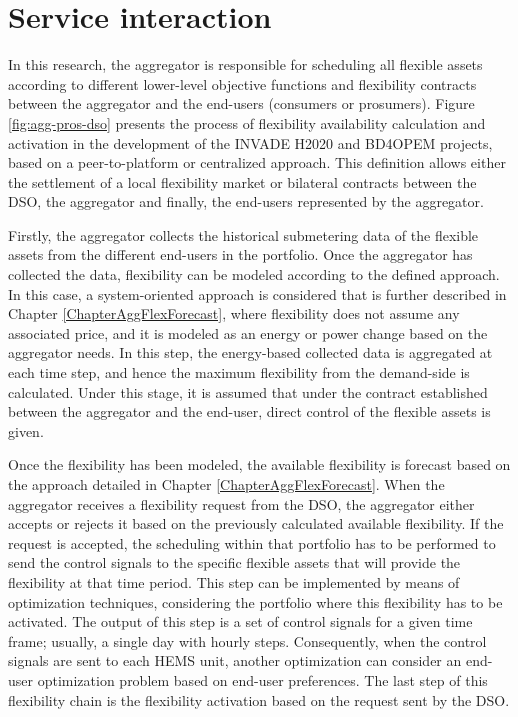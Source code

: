 \section{Service interaction}\label{sec:service_interaction}

In this research, the aggregator is responsible for scheduling all flexible assets according to different lower-level objective functions and flexibility contracts between the aggregator and the end-users (consumers or prosumers). Figure \ref{fig:agg-pros-dso} presents the process of flexibility availability calculation and activation in the development of the INVADE H2020 and BD4OPEM projects, based on a peer-to-platform or centralized approach. This definition allows either the settlement of a local flexibility market or bilateral contracts between the DSO, the aggregator and finally, the end-users represented by the aggregator.  

Firstly, the aggregator collects the historical submetering data of the flexible assets from the different end-users in the portfolio. Once the aggregator has collected the data, flexibility can be modeled according to the defined approach. In this case, a system-oriented approach is considered that is further described in Chapter \ref{ChapterAggFlexForecast}, where flexibility does not assume any associated price, and it is modeled as an energy or power change based on the aggregator needs. In this step, the energy-based collected data is aggregated at each time step, and hence the maximum flexibility from the demand-side is calculated. Under this stage, it is assumed that under the contract established between the aggregator and the end-user, direct control of the flexible assets is given. 

Once the flexibility has been modeled, the available flexibility is forecast based on the approach detailed in Chapter \ref{ChapterAggFlexForecast}. When the aggregator receives a flexibility request from the DSO, the aggregator either accepts or rejects it based on the previously calculated available flexibility. If the request is accepted, the scheduling within that portfolio has to be performed to send the control signals to the specific flexible assets that will provide the flexibility at that time period. This step can be implemented by means of optimization techniques, considering the portfolio where this flexibility has to be activated. The output of this step is a set of control signals for a given time frame; usually, a single day with hourly steps.
Consequently, when the control signals are sent to each HEMS unit, another optimization can consider an end-user optimization problem based on end-user preferences. The last step of this flexibility chain is the flexibility activation based on the request sent by the DSO.


